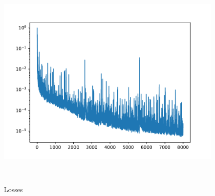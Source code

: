 \documentclass[USenglish]{article}
\newcommand{\1}{\begin{pmatrix}
		1\\
		1
\end{pmatrix}}
\begin{document}
\begin{figure}
\begin{minipage}{0.32\textwidth}
\includegraphics[width=\textwidth, trim={20 0 45 30}, clip]{loss_convAE_trial_002_batch_180.pdf}
\end{minipage}\\
	\caption{Losses}
\end{figure}
\end{document}
